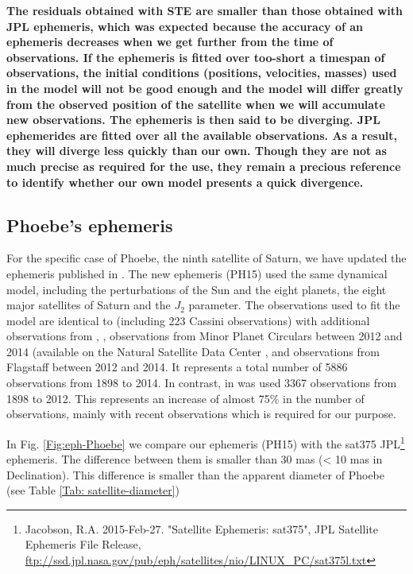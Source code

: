 \documentclass[useAMS,usenatbib]{mn2e}
\begin{document}
\textbf{The residuals obtained with STE are smaller than those obtained with JPL ephemeris, which was expected because the accuracy of an ephemeris decreases when we get further from the time of observations. If the ephemeris is fitted over too-short a timespan of observations, the initial conditions (positions, velocities, masses) used in the model will not be good enough and the model will differ greatly from the observed position of the satellite when we will accumulate new observations. The ephemeris is then said to be diverging.
JPL ephemerides are fitted over all the available observations. As a result, they will diverge less quickly than our own. Though they are not as much precise as required for the use, they remain a precious reference to identify whether our own model presents a quick divergence.}


\subsection{Phoebe's ephemeris}

For the specific case of Phoebe, the ninth satellite of Saturn, we have updated the ephemeris published in \cite{Desmars2013}. The new ephemeris (PH15) used the same dynamical model, including the perturbations of the Sun and the eight planets, the eight major satellites of Saturn and the $J_2$ parameter. The observations used to fit the model are identical to \cite{Desmars2013} (including 223 Cassini observations) with additional observations from , \cite{Peng2015}, observations from Minor Planet Circulars between 2012 and 2014 (available on the Natural Satellite Data Center \textbf{\citep{Arlot2009}}, and observations from Flagstaff \citep{NOFS} between 2012 and 2014. It represents a total number of 5886 observations from 1898 to 2014. In contrast, in \cite{Desmars2013} was used 3367 observations from 1898 to 2012. This represents an increase of almost 75\% in the number of observations, mainly with recent observations which is required for our purpose.

In Fig. \ref{Fig:eph-Phoebe} we compare our ephemeris (PH15) with the sat375 JPL\footnote{Jacobson, R.A. 2015-Feb-27. "Satellite Ephemeris: sat375", JPL Satellite Ephemeris File Release, \url{ftp://ssd.jpl.nasa.gov/pub/eph/satellites/nio/LINUX_PC/sat375l.txt}} ephemeris. The difference between them is smaller than 30 mas (< 10 mas in Declination). This difference is smaller than the apparent diameter of Phoebe (see Table \ref{Tab: satellite-diameter})
\end{document}
